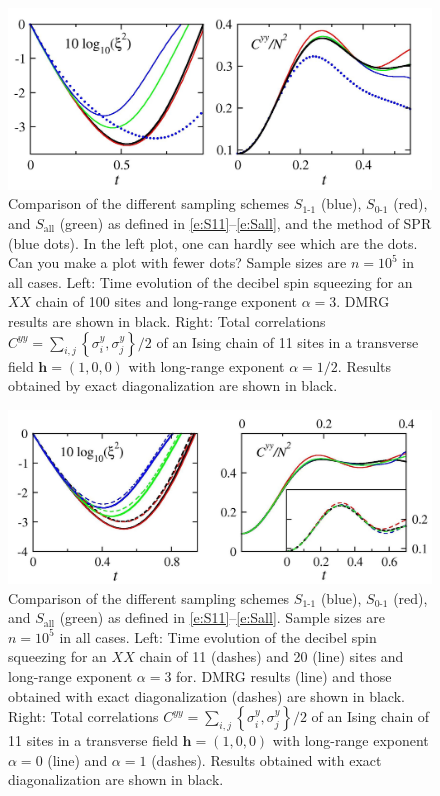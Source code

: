 \documentclass[aps,prl,showpacs,amsmath,amssymb,superscriptaddress,reprint,10pt]{revtex4-1}
\newcommand{\mk}[1]{{\color{michael} #1}}
\newcommand{\mvec}[1]{\boldsymbol #1}
\begin{document}
\begin{bibunit}
\begin{figure}\centering
\includegraphics[width=\linewidth]{./XY_TF_compare_samplings.jpg}
\caption{\label{f:sampling}%
Comparison of the different sampling schemes $S_{\text{1-1}}$ (blue), $S_{\text{0-1}}$ (red), and $S_{\text{all}}$ (green) as defined in \eqref{e:S11}--\eqref{e:Sall}, and the method of SPR (blue dots). \mk{In the left plot, one can hardly see which are the dots. Can you make a plot with fewer dots?} Sample sizes are $n=10^5$ in all cases. Left: Time evolution of the decibel spin squeezing for an $XX$ chain of 100 sites and long-range exponent $\alpha=3$. DMRG results are shown in black. Right: Total correlations $C^{yy}=\sum_{i,j}\left\{\sigma_i^y,\sigma_j^y\right\}/2$ of an Ising chain of 11 sites in a transverse field $\mvec{h}=(1,0,0)$ with long-range exponent $\alpha=1/2$. Results obtained by exact diagonalization are shown in black.
}%
\end{figure}

\begin{figure}\centering
\includegraphics[width=\linewidth]{./benchmark_sizes_XY_alpha_TF.jpg}
\caption{\label{f:sampling_2}%
Comparison of the different sampling schemes $S_{\text{1-1}}$ (blue), $S_{\text{0-1}}$ (red), and $S_{\text{all}}$ (green) as defined in \eqref{e:S11}--\eqref{e:Sall}. Sample sizes are $n=10^5$ in all cases. Left: Time evolution of the decibel spin squeezing for an $XX$ chain of 11 (dashes) and 20 (line) sites and long-range exponent $\alpha=3$ for. DMRG results (line) and those obtained with exact diagonalization (dashes) are shown in black. Right: Total correlations $C^{yy}=\sum_{i,j}\left\{\sigma_i^y,\sigma_j^y\right\}/2$ of an Ising chain of 11 sites in a transverse field $\mvec{h}=(1,0,0)$ with long-range exponent $\alpha=0$ (line) and $\alpha=1$ (dashes). Results obtained with exact diagonalization are shown in black.
}%
\end{figure}


\end{bibunit}
\end{document}
